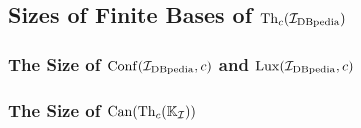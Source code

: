 \subsection{Sizes of Finite Bases of $\operatorname{Th}_c({\mathcal{I}_{\text{DBpedia}}})$}
\label{sec:sizes-finite-bases}

\subsubsection{The Size of $\operatorname{Conf}({\mathcal{I}_{\text{DBpedia}}},c)$ and $\operatorname{Lux}({\mathcal{I}_{\text{DBpedia}}}, c)$}
\label{sec:size-confidbpedia-c}

\subsubsection{The Size of $\operatorname{Can}(\operatorname{Th}_c({\mathbb{K}}_{\mathcal{I}}))$}
\label{sec:size-canth_cc-k_math}



